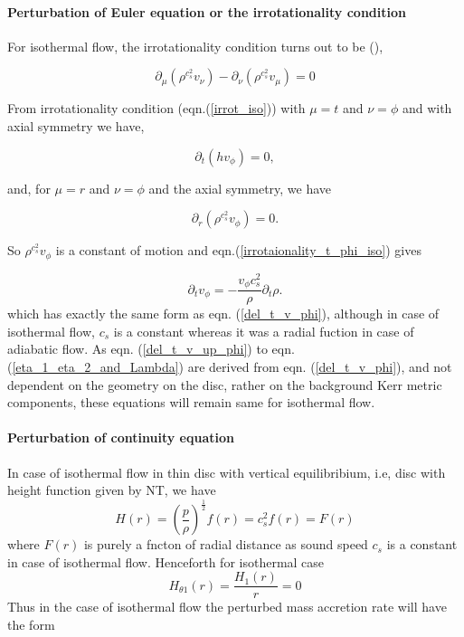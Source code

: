\documentclass[12pt]{article}
\begin{document}
\paragraph{Perturbation of Euler equation or the irrotationality condition} For isothermal flow, the irrotationality condition turns out to be (\citep{bilic99cqg}),

\begin{equation}\label{irrot_iso}
\partial_\mu(\rho^{c_s^2} v_\nu)-\partial_\nu(\rho^{c_s^2} v_\mu) = 0
\end{equation}

From irrotationality condition (eqn.(\ref{irrot_iso})) with $\mu=t$ and $\nu=\phi$ and with axial symmetry we have,

\begin{equation}\label{irrotaionality_t_phi_iso}
\partial_t(h v_\phi)=0,
\end{equation}

\noindent
and, for $\mu=r$ and $\nu=\phi$ and the axial symmetry, we have

\begin{equation}\label{irrotationality_r_phi_iso}
\partial_r(\rho^{c_s^2} v_\phi)=0.
\end{equation}

\noindent
So $\rho^{c_s^2} v_\phi$ is a constant of motion and eqn.(\ref{irrotaionality_t_phi_iso}) gives

\begin{equation}\label{del_t_v_phi_iso}
\partial_t v_\phi=-\frac{v_\phi c_s^2}{\rho}\partial_t \rho.
\end{equation}
which has exactly the same form as eqn. (\ref{del_t_v_phi}), although in case of isothermal flow, $c_s$ is a constant whereas it was a radial fuction in case of adiabatic flow. As eqn. (\ref{del_t_v_up_phi}) to eqn. (\ref{eta_1_eta_2_and_Lambda}) are derived from eqn. (\ref{del_t_v_phi}), and not dependent on the geometry on the disc, rather on the background Kerr metric components, these equations will remain same for isothermal flow.\\

\paragraph{Perturbation of continuity equation} In case of isothermal flow in thin disc with vertical equilibribium, i.e, disc with height function given by NT, we have 
\begin{equation}
H(r) = \left(\frac{p}{\rho}\right)^{\frac{1}{2}} f(r) = c_s^2 f(r) = F(r)
\end{equation}
where $F(r)$ is purely a fncton of radial distance as sound speed $c_s$ is a constant in case of isothermal flow. Henceforth for isothermal case
\begin{equation}
H_{\theta 1} (r) = \frac{H_1 (r)}{r} = 0
\end{equation}
Thus in the case of isothermal flow the perturbed mass accretion rate will have the form
\end{document}
